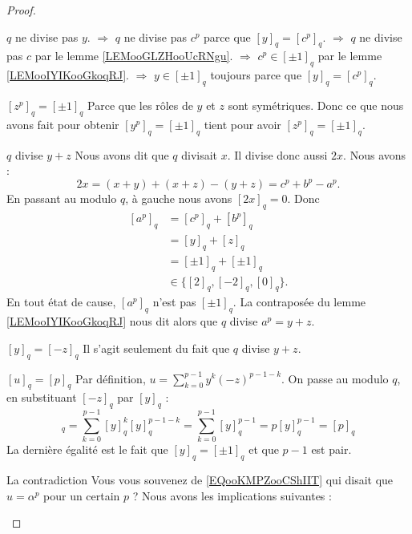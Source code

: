 \begin{proof}
\begin{subproof}
		\( q\) ne divise pas \( y\).\newline
		\( \Rightarrow\) \( q\) ne divise pas \( c^p\) parce que \( [y]_q=[c^p]_q\).\newline
		\( \Rightarrow\) \( q\) ne divise pas \( c\) par le lemme \ref{LEMooGLZHooUcRNgu}.\newline
		\( \Rightarrow\) \( c^p\in[\pm 1]_q\) par le lemme \ref{LEMooIYIKooGkoqRJ}.\newline
		\( \Rightarrow\) \( y\in[\pm 1]_q\) toujours parce que \( [y]_q=[c^p]_q\).

		\item[\( {[z^p]_q=[\pm 1]_q}\)]
		Parce que les rôles de \( y\) et \( z\) sont symétriques. Donc ce que nous avons fait pour obtenir \( [y^p]_q=[\pm1]_q\) tient pour avoir \( [z^p]_q=[\pm 1]_q\).

		\item[\( q\) divise \( y+z\)]
		Nous avons dit que \( q\) divisait \( x\). Il divise donc aussi \( 2x\). Nous avons :
		\begin{equation}
			2x=(x+y)+(x+z)-(y+z)=c^p+b^p-a^p.
		\end{equation}
		En passant au modulo \( q\), à gauche nous avons \( [2x]_q=0\). Donc
		\begin{subequations}
			\begin{align}
				[a^p]_q & =[c^p]_q+[b^p]_q             \\
				        & =[y]_q+[z]_q                 \\
				        & =[\pm 1]_q+[\pm 1]_q         \\
				        & \in\{ [2]_q,[-2]_q,[0]_q \}.
			\end{align}
		\end{subequations}
		En tout état de cause, \( [a^p]_q\) n'est pas \( [\pm 1]_q\). La contraposée du lemme \ref{LEMooIYIKooGkoqRJ} nous dit alors que \( q\) divise \( a^p=y+z\).
		\item[\( {[y]_q=[-z]_q}\)]
		Il s'agit seulement du fait que \( q\) divise \( y+z\).
		\item[\( {[u]_q=[p]_q}\)]
		Par définition, \( u=\sum_{k=0}^{p-1}y^k(-z)^{p-1-k}\). On passe au modulo \( q\), en substituant \( [-z]_q\) par \( [y]_q\) :
		\begin{equation}
			[u]_q=\sum_{k=0}^{p-1}[y]_q^k[y]_q^{p-1-k}
			=\sum_{k=0}^{p-1}[y]_q^{p-1}
			=p[y]_q^{p-1}
				=[p]_q
		\end{equation}
		La dernière égalité est le fait que \( [y]_q=[\pm 1]_q\) et que \( p-1\) est pair.
		\item[La contradiction]
		Vous vous souvenez de \eqref{EQooKMPZooCShIIT} qui disait que \( u=\alpha^p\) pour un certain \( p\) ? Nous avons les implications suivantes :


\end{subproof}
\end{proof}
